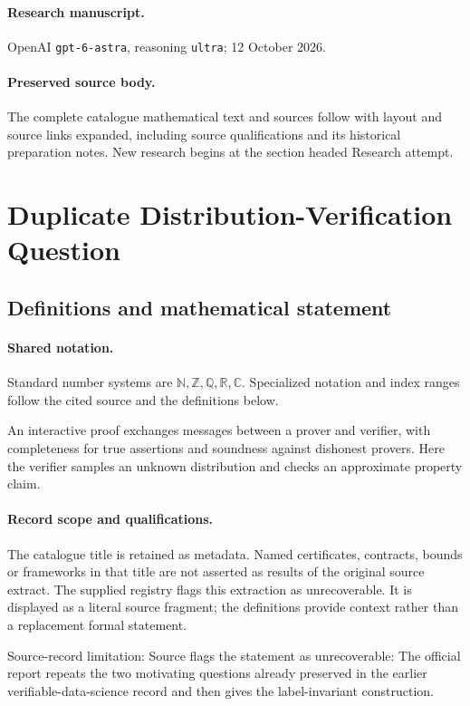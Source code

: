 \documentclass[11pt]{article}
\begin{document}
\paragraph{Research manuscript.} OpenAI \texttt{gpt-6-astra}, reasoning \texttt{ultra}; 12 October 2026.
\paragraph{Preserved source body.} The complete catalogue mathematical text and sources follow with layout and source links expanded, including source qualifications and its historical preparation notes. New research begins at the section headed Research attempt.

\section{Duplicate Distribution-Verification Question}\label{statement}

\subsection{Definitions and mathematical statement}

\paragraph{Shared notation.}Standard number systems are $\mathbb N,\mathbb Z,\mathbb Q,\mathbb R,\mathbb C$. Specialized notation and index ranges follow the cited source and the definitions below.


An interactive proof exchanges messages between a prover and verifier, with completeness for true assertions and soundness against dishonest provers. Here the verifier samples an unknown distribution and checks an approximate property claim.
\paragraph{Record scope and qualifications.}
The catalogue title is retained as metadata. Named certificates, contracts, bounds or frameworks in that title are not asserted as results of the original source extract.
The supplied registry flags this extraction as unrecoverable. It is displayed as a literal source fragment; the definitions provide context rather than a replacement formal statement.

Source-record limitation: Source flags the statement as unrecoverable: The official report repeats the two motivating questions already preserved in the earlier verifiable-data-science record and then gives the label-invariant construction.
\end{document}
